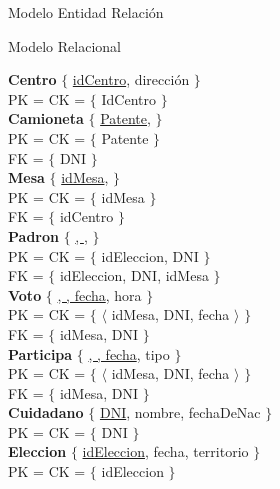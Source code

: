 \begin{section}{Modelo Entidad Relaci\'on}

\begin{subsection}{Modelo Relacional}

\textbf{Centro} $\lbrace$ \underline{idCentro}, direcci\'on $\rbrace$ \\
PK = CK = $ \lbrace $ IdCentro $ \rbrace $ \\

\textbf{Camioneta} $ \lbrace $ \underline{Patente},  $ \rbrace $\\
PK = CK = $ \lbrace $ Patente $ \rbrace $\\
FK = $ \lbrace $ DNI $ \rbrace $\\

\textbf{Mesa} $ \lbrace $ \underline{idMesa},  $ \rbrace $\\
PK = CK = $ \lbrace $ idMesa $ \rbrace $\\
FK = $ \lbrace $ idCentro $ \rbrace $\\

\textbf{Padron} $ \lbrace $ \underline{, },  $ \rbrace $\\
PK = CK = $ \lbrace $ idEleccion, DNI  $ \rbrace $\\
FK = $ \lbrace $ idEleccion, DNI, idMesa $ \rbrace $\\

\textbf{Voto} $ \lbrace $ \underline{, , fecha}, hora $ \rbrace $ \\
PK = CK = $ \lbrace $ $ \langle $ idMesa, DNI, fecha $ \rangle $ $ \rbrace $ \\
FK = $ \lbrace $ idMesa, DNI $ \rbrace $\\

\textbf{Participa} $ \lbrace $ \underline{, , fecha}, tipo $ \rbrace $ \\
PK = CK = $ \lbrace $ $ \langle $ idMesa, DNI, fecha $ \rangle $ $ \rbrace $ \\
FK = $ \lbrace $ idMesa, DNI $ \rbrace $\\

\textbf{Cuidadano} $ \lbrace $ \underline{DNI}, nombre, fechaDeNac $ \rbrace $ \\
PK = CK = $ \lbrace $ DNI $ \rbrace $ \\

\textbf{Eleccion} $ \lbrace $ \underline{idEleccion}, fecha, territorio $ \rbrace $ \\
PK = CK = $ \lbrace $ idEleccion $ \rbrace $ \\

\end{subsection}

\end{section}
